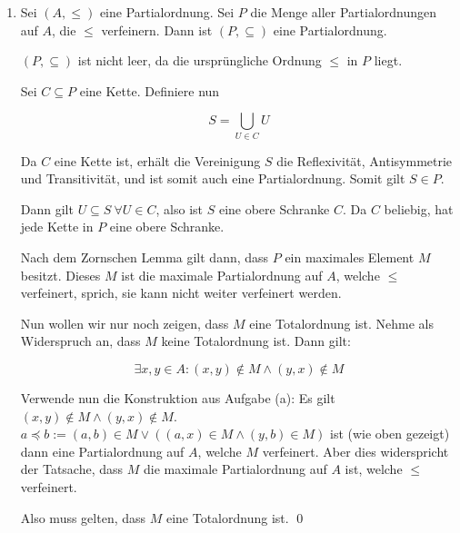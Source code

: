 \documentclass[12pt]{article}
\begin{document}
\begin{enumerate}[label=(\alph*)]
\begin{itemize}
        Also gilt in jedem Fall:

        $$
            a \leq c \lor a \leq x \land y \leq c \iff a \preceq c
        $$

        Wir haben also Transitivität gezeigt.
    \end{itemize}

    Zeige als nächstes, dass $\preceq$ zudem $\leq$ echt verfeinert. z.z.: $\forall a, b \in A : a \leq b \rightarrow a \preceq b$.

    Seien $a, b \in A$ mit $a \leq b$. Dann gilt $a \leq b \lor (a \leq x \land y \leq b)$, also gilt $a \preceq b$.

    $\preceq$ und $\leq$ sind verschieden, da z.b. x $\preceq$ y gilt aber x $\leq$ y nicht.

    $\preceq$ ist also eine echte Verfeinerung von $\leq$. \qed

    \item Sei $(A, \leq)$ eine Partialordnung. Sei $P$ die Menge aller Partialordnungen auf $A$, die $\leq$ verfeinern. Dann ist $(P, \subseteq)$ eine Partialordnung.
    
    $(P, \subseteq)$ ist nicht leer, da die ursprüngliche Ordnung $\leq$ in $P$ liegt.
    
    Sei $C \subseteq P$ eine Kette. Definiere nun
    
    $$
        S = \bigcup\limits_{U \in C} U
    $$

    Da $C$ eine Kette ist, erhält die Vereinigung $S$ die Reflexivität, Antisymmetrie und Transitivität, und ist somit auch eine Partialordnung. Somit gilt $S \in P$.
    
    Dann gilt $U \subseteq S \ \forall U \in C$, also ist $S$ eine obere Schranke $C$. Da $C$ beliebig, hat jede Kette in $P$ eine obere Schranke.

    Nach dem Zornschen Lemma gilt dann, dass $P$ ein maximales Element $M$ besitzt. Dieses $M$ ist die maximale Partialordnung auf $A$, welche $\leq$ verfeinert, sprich, sie kann nicht weiter verfeinert werden.
    
    Nun wollen wir nur noch zeigen, dass $M$ eine Totalordnung ist. Nehme als Widerspruch an, dass $M$ keine Totalordnung ist. Dann gilt:

    $$
        \exists x, y \in A : (x, y) \notin M \land (y, x) \notin M
    $$

    Verwende nun die Konstruktion aus Aufgabe (a): Es gilt $(x, y) \notin M \land (y, x) \notin M$. $a \preceq b := (a, b) \in M \lor \left((a, x) \in M \land (y, b) \in M\right)$ ist (wie oben gezeigt) dann eine Partialordnung auf $A$, welche $M$ verfeinert. Aber dies widerspricht der Tatsache, dass $M$ die maximale Partialordnung auf $A$ ist, welche $\leq$ verfeinert.

    Also muss gelten, dass $M$ eine Totalordnung ist. \qed


\end{enumerate}
\end{document}
